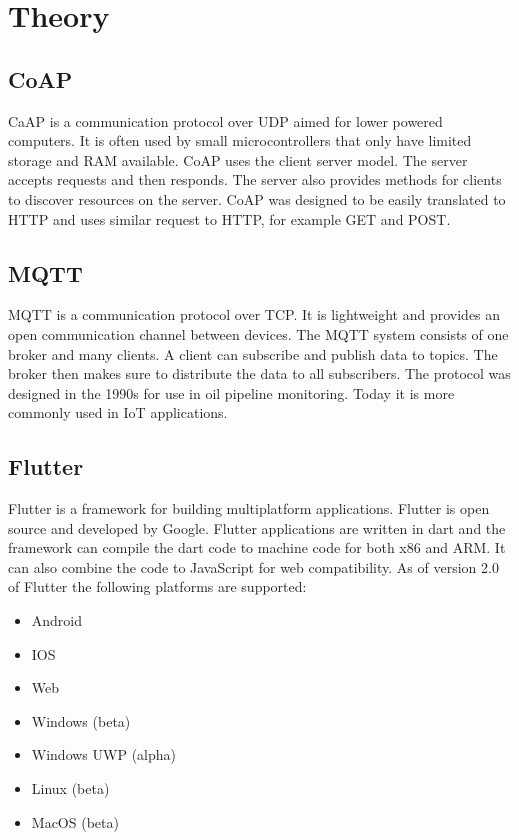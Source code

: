 \section{Theory}
\label{ch:theory}
\noindent

\subsection{CoAP}
CaAP is a communication protocol over UDP aimed for lower powered computers. It is often used by small microcontrollers that only have limited storage and RAM available. CoAP uses the client server model. The server accepts requests and then responds. The server also provides methods for clients to discover resources on the server. CoAP was designed to be easily translated to HTTP and uses similar request to HTTP, for example GET and POST. \cite{rfc7252}

\subsection{MQTT}
MQTT is a communication protocol over TCP. It is lightweight and provides an open communication channel between devices. The MQTT system consists of one broker and many clients. A client can subscribe and publish data to topics. The broker then makes sure to distribute the data to all subscribers. The protocol was designed in the 1990s for use in oil pipeline monitoring. Today it is more commonly used in IoT applications. \cite{MQTT}
\subsection{Flutter}
Flutter is a framework for building multiplatform applications. Flutter is open source and developed by Google. Flutter applications are written in dart and the framework can compile the dart code to machine code for both x86 and ARM. It can also combine the code to JavaScript for web compatibility. \cite{flutter} As of version 2.0 of Flutter the following platforms are supported: \cite{flutterPlat}
\begin{itemize}
    \item Android
    \item IOS
    \item Web
    \item Windows (beta)
    \item Windows UWP (alpha)
    \item Linux (beta)
    \item MacOS (beta)
\end{itemize}

